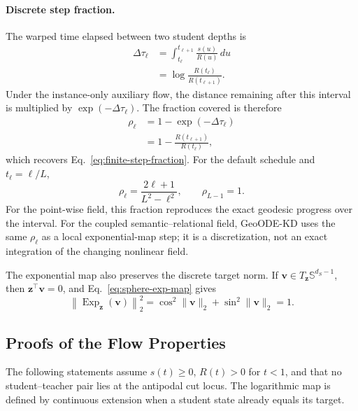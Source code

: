 \paragraph{Discrete step fraction.}
The warped time elapsed between two student depths is
\begin{align}
    \Delta\tau_\ell
    &=
    \int_{t_\ell}^{t_{\ell+1}}
    \frac{s(u)}{R(u)}\,du
    \nonumber\\
    &=
    \log\frac{R(t_\ell)}{R(t_{\ell+1})}.
    \label{eq:app-warped-layer-interval}
\end{align}
Under the instance-only auxiliary flow, the distance remaining after this
interval is multiplied by $\exp(-\Delta\tau_\ell)$. The fraction covered is
therefore
\begin{align}
    \rho_\ell
    &=
    1-\exp(-\Delta\tau_\ell)
    \nonumber\\
    &=
    1-\frac{R(t_{\ell+1})}{R(t_\ell)},
    \label{eq:app-step-fraction}
\end{align}
which recovers Eq.~\ref{eq:finite-step-fraction}. For the default schedule and
$t_\ell=\ell/L$,
\begin{equation}
    \rho_\ell
    =
    \frac{2\ell+1}{L^2-\ell^2},
    \qquad
    \rho_{L-1}=1.
    \label{eq:app-linear-step-fraction}
\end{equation}
For the point-wise field, this fraction reproduces the exact geodesic progress
over the interval. For the coupled semantic--relational field, GeoODE-KD uses
the same $\rho_\ell$ as a local exponential-map step; it is a discretization,
not an exact integration of the changing nonlinear field.

The exponential map also preserves the discrete target norm. If
$\mathbf{v}\in T_{\mathbf{z}}\mathbb{S}^{d_S-1}$, then
$\mathbf{z}^\top\mathbf{v}=0$, and Eq.~\ref{eq:sphere-exp-map} gives
\begin{equation}
    \left\lVert
        \operatorname{Exp}_{\mathbf{z}}(\mathbf{v})
    \right\rVert_2^2
    =
    \cos^2\lVert\mathbf{v}\rVert_2
    +
    \sin^2\lVert\mathbf{v}\rVert_2
    =1.
    \label{eq:app-exp-map-norm}
\end{equation}

\subsection{Proofs of the Flow Properties}
\label{app:proofs}

The following statements assume $s(t)\geq0$, $R(t)>0$ for $t<1$, and that no
student--teacher pair lies at the antipodal cut locus. The logarithmic map is
defined by continuous extension when a student state already equals its target.

